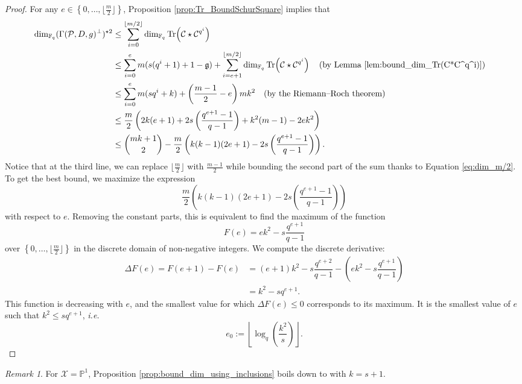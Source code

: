 \documentclass[lettersize,journal]{IEEEtran}
\theoremstyle{plain}
\theoremstyle{definition}
\theoremstyle{remark}
\newtheorem{remark}[thm]{Remark}
\DeclareMathOperator{\trace}{Tr}
\newcommand{\calP}{\mathcal{P}}
\newcommand{\calC}{\mathcal{C}}
\newcommand{\calX}{\mathcal{X}}
\newcommand{\fq}{\mathbb{F}_{q}}
\newcommand{\PP}{\mathbb{P}}
\newcommand{\Tr}[1]{\trace\!\left(#1\right)}
\newcommand{\set}[1]{\left\{#1\right\}}
\begin{document}
	\begin{proof}
		For any $e \in \set{0,\dots,\lfloor \frac{m}{2} \rfloor}$, Proposition \ref{prop:Tr_BoundSchurSquare} implies that
		\begin{align*}
			\dim_{\fq}(\Gamma(\calP,D,g)^{\perp})^{\star 2}
			& \leq \sum\limits_{i=0}^{\lfloor m/2 \rfloor} \dim_{\fq} \Tr{\calC \star \calC^{q^i}} &\\
			& \leq \sum\limits_{i=0}^{e} m(s(q^i+1)+1-\mathfrak{g})  + \sum\limits_{i=e+1}^{\lfloor m/2 \rfloor} \dim_{\fq} \Tr{\calC \star \calC^{q^i}} \quad \text{(by Lemma \ref{lem:bound_dim_Tr(C*C^q^i)})}\\
			& \leq \sum\limits_{i=0}^{e} m(sq^i+k) + \left( \frac{m-1}{2} -e \right)mk^2 \quad \text{(by the Riemann--Roch theorem)}\\
			& \leq \frac{m}{2}\left(2k(e+1)+2s\left(\dfrac{q^{e+1}-1}{q-1}\right)+k^2(m-1)-2ek^2  \right) &\\
			& \leq \binom{mk+1}{2} -  \dfrac{m}{2}\left(k(k-1)(2e+1)-2s\left(\dfrac{q^{e+1}-1}{q-1}\right)\right).&
		\end{align*}
		Notice that at the third line, we can replace $\lfloor \frac{m}{2} \rfloor$ with $\frac{m-1}{2}$ while bounding the second part of the sum thanks to Equation \eqref{eq:dim_m/2}.
		To get the best bound, we maximize the expression $$ \dfrac{m}{2}\left(k(k-1)(2e+1)-2s\left(\dfrac{q^{e+1}-1}{q-1}\right)\right)$$ with respect to $e$. Removing the constant parts, this is equivalent to find the maximum of the function
		$$F(e) = ek^2-s\dfrac{q^{e+1}}{q-1}$$
		over $\set{0,\dots,\lfloor \frac{m}{2} \rfloor}$ in the discrete domain of non-negative integers.  
		We compute the discrete derivative:
		\begin{align*}
			\Delta F(e) = F(e+1)-F(e) &= (e+1)k^2-s\dfrac{q^{e+2}}{q-1} - \left(ek^2-s\dfrac{q^{e+1}}{q-1}\right) \\
			&= k^2 - sq^{e+1}.
		\end{align*}
		This function is decreasing with $e$, and the smallest value for which $\Delta F(e) \leq 0$ corresponds to its maximum. It is the smallest value of $e$ such that $k^2 \leq sq^{e+1}$, \emph{i.e.}
		$$e_0 :=  \left\lfloor \log_q\left(\dfrac{k^2}{s}\right)\right\rfloor.$$
	\end{proof}
	
	\begin{remark}
		For $\calX=\PP^1$, Proposition \ref{prop:bound_dim_using_inclusions} boils down to \cite[Theorem 19]{MT21} with $k=s+1$.
	\end{remark}
	
\end{document}
